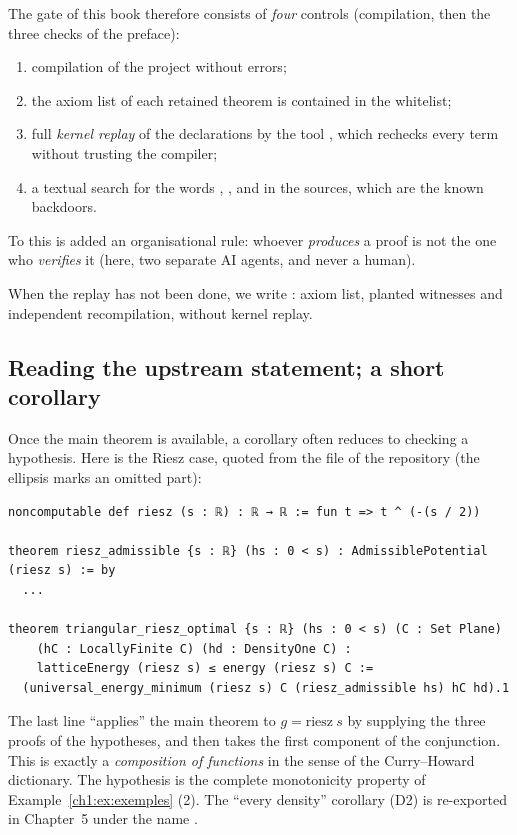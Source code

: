 The \tierA{} gate of this book therefore consists of \emph{four} controls (compilation, then the three checks of the preface):
\begin{enumerate}
\item compilation of the project without errors;
\item the axiom list of each retained theorem is contained in the whitelist;
\item full \emph{kernel replay} of the declarations by the tool , which rechecks every term without trusting the compiler;
\item a textual search for the words , ,  and  in the sources, which are the known backdoors.
\end{enumerate}
To this is added an organisational rule: whoever \emph{produces} a proof is not the one who \emph{verifies} it (here, two separate AI agents, and never a human).

When the  replay has not been done, we write \tierAs{}: axiom list, planted witnesses and independent recompilation, without kernel replay.

\subsection{Reading the upstream statement; a short corollary}

Once the main theorem is available, a corollary often reduces to checking a hypothesis. Here is the Riesz case,
quoted from the file  of the repository (the ellipsis marks an omitted part):

\begin{leanbox}
\begin{lstlisting}[language=Lean]
noncomputable def riesz (s : ℝ) : ℝ → ℝ := fun t => t ^ (-(s / 2))

theorem riesz_admissible {s : ℝ} (hs : 0 < s) : AdmissiblePotential (riesz s) := by
  ...

theorem triangular_riesz_optimal {s : ℝ} (hs : 0 < s) (C : Set Plane)
    (hC : LocallyFinite C) (hd : DensityOne C) :
    latticeEnergy (riesz s) ≤ energy (riesz s) C :=
  (universal_energy_minimum (riesz s) C (riesz_admissible hs) hC hd).1
\end{lstlisting}
\end{leanbox}

The last line ``applies'' the main theorem to $g=\text{riesz}\ s$ by supplying the three proofs of the hypotheses, and then takes the first component
 of the conjunction. This is exactly a \emph{composition of functions} in the sense of the Curry--Howard dictionary.
The hypothesis  is the complete monotonicity property of Example~\ref{ch1:ex:exemples} (2). The ``every density'' corollary (D2) is re-exported in Chapter~5 under the name .

